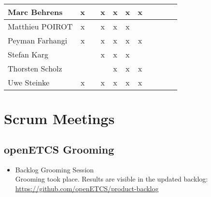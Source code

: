 \documentclass[a4paper, 11pt]{article}
\begin{document}
\begin{tabular}{|l|c|c|c|c||c|c|c||c|c|c|}
Marc Behrens         & x &   & x & x & x & x &   \\\hline
Matthieu POIROT       & x  &   & x  & x & x &  &   \\\hline
Peyman Farhangi      & x  &   & x & x & x & x &   \\\hline
Stefan Karg          &   &   & x  & x & x &  &  \\\hline
Thorsten Scholz      &   &   &  & x & x & x &  \\\hline
Uwe Steinke          & x &   & x & x & x & x &  \\\hline
\end{tabular}


\section{Scrum Meetings}

\subsection{openETCS Grooming}
\begin{itemize}
\item Backlog Grooming Session\\
Grooming took place. Results are visible in the updated backlog:\\
\url{https://github.com/openETCS/product-backlog}

\end{itemize}
\end{document}

